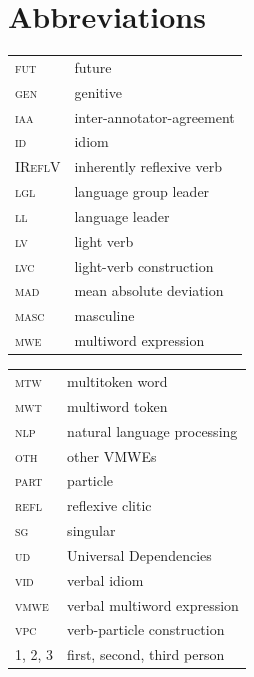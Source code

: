 \documentclass[output=paper,modfonts]{langscibook}
\begin{document}
\section*{Abbreviations}
\label{sec:abbreviations}
%
\begin{tabularx}{.5\textwidth}{lQ}
\textsc{fut} & future \\
\textsc{gen} & genitive \\
\textsc{iaa} & \mbox{inter-annotator-agreement} \\
\textsc{id} & idiom \\
\textsc{IReflV} & inherently reflexive verb \\
\textsc{lgl} & language group leader \\
\textsc{ll} & language leader \\
\textsc{lv} & light verb \\
\textsc{lvc} & light-verb construction \\
\textsc{mad} & mean absolute deviation \\
\textsc{masc} & masculine \\
\textsc{mwe} & multiword expression \\
\end{tabularx}
\begin{tabularx}{.45\textwidth}{lp{4.5cm}}
\textsc{mtw} & multitoken word \\
\textsc{mwt} & multiword token \\
\textsc{nlp} & natural language processing \\
\textsc{oth} & other VMWEs \\
\textsc{part} & particle \\
\textsc{refl} & reflexive clitic \\
\textsc{sg} & singular \\
\textsc{ud} & Universal Dependencies \\
\textsc{vid} & verbal idiom \\
\textsc{vmwe} & verbal multiword expression \\
\textsc{vpc} & verb-particle construction \\
\textsc{1, 2, 3} & first, second, third person \\ 
\end{tabularx}




{\sloppy
\printbibliography[heading=subbibliography,notkeyword=this]
}

%
\end{document}
